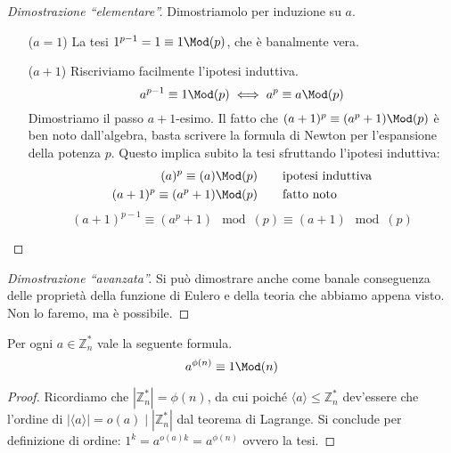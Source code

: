\begin{proof}[Dimostrazione \enquote{elementare}]
	Dimostriamolo per induzione su $a$.
	\begin{enumerate}
		\item[($a=1$)]La tesi  $1^{p-1}=1\equiv1\Mod(p)$, che è banalmente vera. 
		\item[($a+1$)] Riscriviamo facilmente l'ipotesi induttiva.
		\begin{equation*}
		a^{p-1}\equiv1\Mod(p)\iff a^p\equiv a\Mod(p)
		\end{equation*}
		Dimostriamo il passo $a+1$-esimo. Il fatto che $(a+1)^p\equiv(a^p+1)\Mod(p)$ è ben noto dall'algebra, basta scrivere la formula di Newton per l'espansione della potenza $p$. Questo implica subito la tesi sfruttando l'ipotesi induttiva:
		\begin{align*}
		(a)^{p}\equiv(a)\Mod(p) \ \ \ \ \ \ &\text{ipotesi induttiva}\\
		(a+1)^p\equiv(a^p+1)\Mod(p) \ \ \ \ \ \ &\text{fatto noto}\\
		\end{align*}
		\begin{equation*}
		(a+1)^{p-1}\equiv (a^p+1)\mod(p)\equiv (a+1)\mod(p)
		\end{equation*}
	\end{enumerate}
\end{proof}
\begin{proof}[Dimostrazione \enquote{avanzata}] 
	Si può dimostrare anche come banale conseguenza delle proprietà della funzione di Eulero e della teoria che abbiamo appena visto. \\ Non lo faremo, ma è possibile. 
\end{proof}
\begin{teorema}
	Per ogni $a\in\mathbb{Z}_n^*$ vale la seguente formula.
	\begin{equation*}
	a^{\phi(n)}\equiv 1 \Mod(n)
	\end{equation*}
\end{teorema}
\begin{proof}
	Ricordiamo che $|\mathbb{Z}^*_n| = \phi(n)$, da cui poiché $\langle a\rangle \le \mathbb{Z}^*_n$ dev'essere che l'ordine di $|\langle a\rangle| = o(a) \mid |\mathbb{Z}^*_n|$ dal teorema di Lagrange. Si conclude per definizione di ordine: $1^k = a^{o(a)k} = a^{\phi(n)}$ ovvero la tesi. 
\end{proof}




